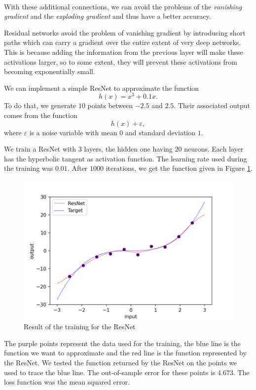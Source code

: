 \documentclass[10pt,a4paper]{article}
\theoremstyle{definition}
\theoremstyle{definition}
\theoremstyle{definition}
\begin{document}
~

With these additional connections, we can avoid the problems of the \textit{vanishing gradient} and the \textit{exploding gradient} and thus have a better accuracy. 



Residual networks avoid the problem of vanishing gradient by introducing short paths which can carry a gradient over the entire extent of very deep networks. This is because adding the information from the previous layer will make these activations larger, so to some extent, they will prevent these activations from becoming exponentially small.

We can implement a simple ResNet to approximate the function
$$
h(x) = x^3 + 0.1x.
$$
To do that, we generate $10$ points between $-2.5$ and $2.5$. Their associated output comes from the function
$$
h(x) + \varepsilon,
$$
where $\varepsilon$ is a noise variable with mean $0$ and standard deviation $1$.

We train a ResNet with $3$ layers, the hidden one having $20$ neurons. Each layer has the hyperbolic tangent as activation function. The learning rate used during the training was $0.01$. After $1000$ iterations, we get the function given in Figure \ref{example_resnet}.

\begin{figure}[!h]
\center
\includegraphics[scale=0.5]{ex_resnet.png}
\caption{Result of the training for the ResNet}
\label{example_resnet}
\end{figure}

The purple points represent the data used for the training, the blue line is the function we want to approximate and the red line is the function represented by the ResNet. We tested the function returned by the ResNet on the points we used to trace the blue line. The out-of-sample error for these points is $4.673$. The loss function was the mean squared error.
\end{document}
